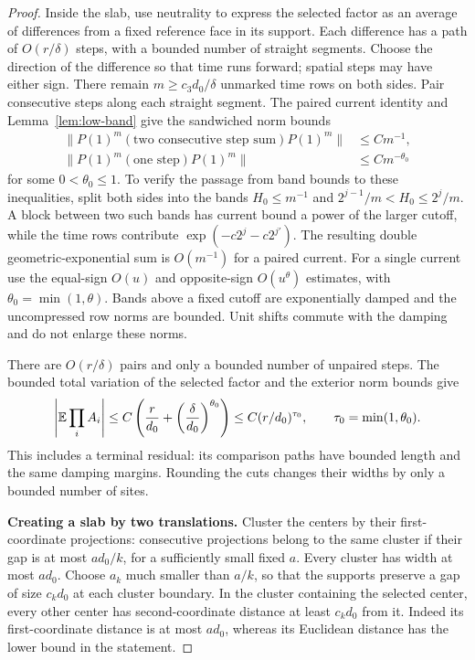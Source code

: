 \begin{proof}
Inside the slab, use neutrality to express the selected factor as an
average of differences from a fixed reference face in its support.
Each difference has a path of \(O(r/\delta)\) steps, with a bounded
number of straight segments. Choose the direction of the difference
so that time runs forward; spatial steps may have either sign.
There remain \(m\ge c_3d_0/\delta\) unmarked time rows on both sides.
Pair consecutive steps along each straight segment. The paired current
identity and Lemma~\ref{lem:low-band} give the sandwiched norm bounds
\begin{equation}\label{eq:prob-damped-costs}
 \begin{aligned}
 \|P(1)^m(\text{two consecutive step sum})P(1)^m\|
       &\le C m^{-1},\\
 \|P(1)^m(\text{one step})P(1)^m\|
       &\le C m^{-\theta_0}
 \end{aligned}
\end{equation}
for some \(0<\theta_0\le1\). To verify the passage from band bounds to
these inequalities, split both sides into the bands
\(H_0\le m^{-1}\) and
\(2^{j-1}/m<H_0\le2^j/m\).
A block between two such bands has current bound a power of the larger
cutoff, while the time rows contribute
\(\exp(-c2^j-c2^{j'})\). The resulting double geometric-exponential
sum is \(O(m^{-1})\) for a paired current. For a single current use the
equal-sign \(O(u)\) and opposite-sign \(O(u^\theta)\) estimates,
with \(\theta_0=\min(1,\theta)\). Bands above a fixed cutoff are
exponentially damped and the uncompressed row norms are bounded.
Unit shifts commute with the damping and do not enlarge these norms.

There are \(O(r/\delta)\) pairs and only a bounded number of unpaired
steps. The bounded total variation of the selected factor and the
exterior norm bounds give
\[
 \left|\mathbb E\prod_iA_i\right|
 \le C\left(\frac r{d_0}
               +\left(\frac\delta{d_0}\right)^{\theta_0}\right)
 \le C(r/d_0)^{\tau_0},\qquad \tau_0=\min(1,\theta_0).
\]
This includes a terminal residual: its comparison paths have bounded
length and the same damping margins. Rounding the cuts changes their
widths by only a bounded number of sites.

\smallskip\noindent\textbf{Creating a slab by two translations.}
Cluster the centers
by their first-coordinate projections: consecutive projections belong
to the same cluster if their gap is at most \(a d_0/k\), for a sufficiently
small fixed \(a\). Every cluster has width at most \(a d_0\).
Choose \(a_k\) much smaller than \(a/k\), so that the supports preserve
a gap of size \(c_kd_0\) at each cluster boundary.
In the cluster containing the selected center, every other center has
second-coordinate distance at least \(c_kd_0\) from it. Indeed its
first-coordinate distance is at most \(a d_0\), whereas its Euclidean
distance has the lower bound in the statement.


\end{proof}
